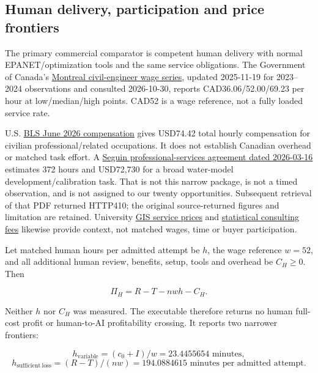 \documentclass[
  11pt,
]{article}
\begin{document}
\hypertarget{human-delivery-participation-and-price-frontiers}{%
\subsection{Human delivery, participation and price
frontiers}\label{human-delivery-participation-and-price-frontiers}}

The primary commercial comparator is competent human delivery with
normal EPANET/optimization tools and the same service obligations. The
Government of Canada's
\href{https://www.jobbank.gc.ca/marketreport/wages-occupation/22376/geo25154}{Montreal
civil-engineer wage series}, updated 2025-11-19 for 2023--2024
observations and consulted 2026-10-30, reports CAD36.06/52.00/69.23 per
hour at low/median/high points. CAD52 is a wage reference, not a fully
loaded service rate.

U.S. \href{https://www.bls.gov/news.release/ecec.t02.htm}{BLS June 2026
compensation} gives USD74.42 total hourly compensation for civilian
professional/related occupations. It does not establish Canadian
overhead or matched task effort. A
\href{https://cityofseguintx.legistar.com/View.ashx?GUID=7ECD6DB4-BA96-4E91-80B2-A43F7471B839\&ID=15349896\&M=F}{Seguin
professional-services agreement dated 2026-03-16} estimates 372 hours
and USD72,730 for a broad water-model development/calibration task. That
is not this narrow package, is not a timed observation, and is not
assigned to our twenty opportunities. Subsequent retrieval of that PDF
returned HTTP410; the original source-returned figures and limitation
are retained. University
\href{https://ucanr.edu/program/informatics-and-gis-program/service-center-rates}{GIS
service prices} and
\href{https://stat.osu.edu/resources/consulting/external-entities}{statistical
consulting fees} likewise provide context, not matched wages, time or
buyer participation.

Let matched human hours per admitted attempt be \(h\), the wage
reference \(w=52\), and all additional human review, benefits, setup,
tools and overhead be \(C_H\ge0\). Then

\[
\Pi_H=R-T-nwh-C_H.
\]

Neither \(h\) nor \(C_H\) was measured. The executable therefore returns
no human full-cost profit or human-to-AI profitability crossing. It
reports two narrower frontiers:

\[
h_{\mathrm{variable}}=(c_0+I)/w
 =23.4455654\text{ minutes},
\] \[
h_{\mathrm{sufficient\ loss}}=(R-T)/(nw)
 =194.0884615\text{ minutes per admitted attempt}.
\]
\end{document}

